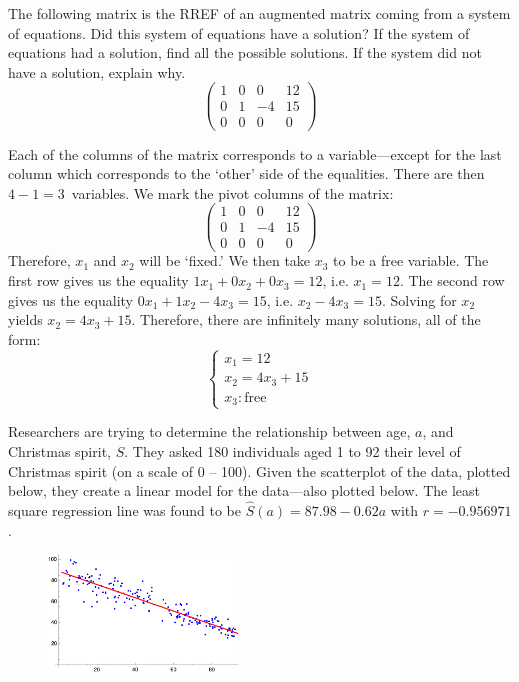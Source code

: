 \documentclass[12pt,letterpaper]{exam}
\begin{document}
\begin{questions}
\newpage
\question[10] The following matrix is the RREF of an augmented matrix coming from a system of equations. Did this system of equations have a solution? If the system of equations had a solution, find all the possible solutions. If the system did not have a solution, explain why. 
	\[
	\begin{pmatrix}
	1 & 0 & 0 & 12 \\
	0 & 1 & -4 & 15 \\
	0 & 0 & 0 & 0 
	\end{pmatrix}
	\] \pspace

\sol Each of the columns of the matrix corresponds to a variable---except for the last column which corresponds to the `other' side of the equalities. There are then $4 - 1= 3$~variables. We mark the pivot columns of the matrix: 
	\[
	\begin{pmatrix}
	\boxed{1} & 0 & 0 & 12 \\
	0 & \boxed{1} & -4 & 15 \\
	0 & 0 & 0 & 0 
	\end{pmatrix}
	\]
Therefore, $x_1$ and $x_2$ will be `fixed.' We then take $x_3$ to be a free variable. The first row gives us the equality $1x_1 + 0x_2 + 0x_3= 12$, i.e. $x_1= 12$. The second row gives us the equality $0x_1 + 1x_2 - 4x_3= 15$, i.e. $x_2 - 4x_3= 15$. Solving for $x_2$ yields $x_2= 4x_3 + 15$. Therefore, there are infinitely many solutions, all of the form:
	\[
	\begin{cases}
	x_1= 12 \\
	x_2= 4x_3 + 15 \\
	x_3 \colon \text{free}
	\end{cases}
	\]



\newpage
\question[10] Researchers are trying to determine the relationship between age, $a$, and Christmas spirit, $S$. They asked 180 individuals aged 1 to 92 their level of Christmas spirit (on a scale of 0 -- 100). Given the scatterplot of the data, plotted below, they create a linear model for the data---also plotted below. The least square regression line was found to be $\widehat{S}(a)= 87.98 - 0.62a$ with $r= -0.956971$. \par
	\begin{figure}[h]
	\centering
	\includegraphics[width=0.45\textwidth]{xmas_spirit.png}
	\end{figure}


\end{questions}
\end{document}
